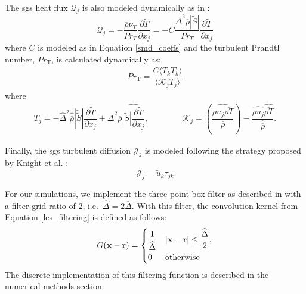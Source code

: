 The \gls{sgs} heat flux $\mathcal{Q}_j$ is also modeled dynamically as in \cite{LES_Comp}:
\begin{equation} \label{sgs_heat_flux}
\mathcal{Q}_j = - \dfrac{\overline{\rho}\nu_T}{Pr_T} \dfrac{\partial \widetilde{T}}{\partial x_j} = - C\dfrac{\overline{\Delta}^2 \overline{\rho}  |\widetilde{S}|}{Pr_T} \dfrac{\partial \widetilde{T}}{\partial x_j} 
\end{equation}
where $C$ is modeled as in Equation \ref{smd_coeffs} and the turbulent Prandtl number, $Pr_\text{T}$, is calculated dynamically as:
\begin{equation}
\begin{aligned}
	Pr_\text{T} = \dfrac{C \langle T_k T_k  \rangle}{\langle \mathcal{K}_j T_j \rangle}
\end{aligned}
\end{equation}
where 
\begin{equation}
\begin{aligned}
	T_j = - \widehat{\Delta}^2  \widehat{\overline{\rho}} |\breve{\widetilde{S}}| \dfrac{\partial \breve{\widetilde{T}}}{\partial x_j} +  \overline{\Delta}^2  \overline{\rho} \widehat{|\widetilde{S}| \dfrac{\partial \widetilde{T}}{\partial x_j}}, \qquad \qquad \mathcal{K}_j = \left( \dfrac{ \widehat{\overline{\rho u_j} \overline{\rho T}}}{\overline{\rho}} \right) - \dfrac{ \widehat{\overline{\rho u_j}} \widehat{ \overline{\rho T}}}{\widehat{\overline{\rho}}}.
\end{aligned}
\end{equation}

Finally, the \gls{sgs} turbulent diffusion $\mathcal{J}_j$ is modeled following the strategy proposed by Knight et al. \cite{}:
\begin{equation} \label{sgs_turb_diff}
\mathcal{J}_j = \widetilde{u}_k \tau_{jk}
\end{equation}

For our simulations, we implement the three point box filter as described in \cite{filter} with a filter-grid ratio of 2, i.e.\  $\widehat{\Delta}=2\overline{\Delta}$. With this filter, the convolution kernel from Equation \ref{les_filtering} is defined as follows: 
\begin{equation} \label{LES_cont_filter}
G(\vb{x} - \vb{r}) = 
\begin{cases} 
      \dfrac{1}{\widehat{\Delta}} & |\vb{x} - \vb{r}|\leq \dfrac{\widehat{\Delta}}{2}, \vspace{2pt}\\ 
      0 & \text{otherwise}
   \end{cases}
\end{equation}
The discrete implementation of this filtering function is described in the numerical methods section. 

